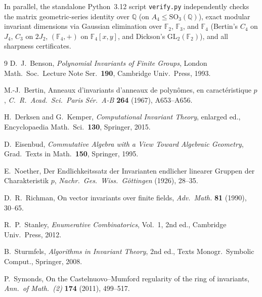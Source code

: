 \documentclass[11pt]{article}
\theoremstyle{definition}
\theoremstyle{remark}
\begin{document}
In parallel, the standalone Python~3.12 script \texttt{verify.py} independently checks the matrix geometric-series identity over $\mathbb{Q}$ (on $A_4 \le \mathrm{SO}_3(\mathbb{Q})$), exact modular invariant dimensions via Gaussian elimination over $\mathbb{F}_2$, $\mathbb{F}_3$, and $\mathbb{F}_4$ (Bertin's $C_4$ on $J_4$, $C_3$ on $2J_2$, $(\mathbb{F}_4,+)$ on $\mathbb{F}_4[x,y]$, and Dickson's $\mathrm{GL}_2(\mathbb{F}_2)$), and all sharpness certificates.

\begin{thebibliography}{9}
D.~J.~Benson, \emph{Polynomial Invariants of Finite Groups}, London Math.\ Soc.\ Lecture Note Ser.\ \textbf{190}, Cambridge Univ.\ Press, 1993.

M.-J.~Bertin, Anneaux d'invariants d'anneaux de polyn\^omes, en caract\'eristique $p$, \emph{C.\ R.\ Acad.\ Sci.\ Paris S\'er.\ A-B} \textbf{264} (1967), A653--A656.

H.~Derksen and G.~Kemper, \emph{Computational Invariant Theory}, enlarged ed., Encyclopaedia Math.\ Sci.\ \textbf{130}, Springer, 2015.

D.~Eisenbud, \emph{Commutative Algebra with a View Toward Algebraic Geometry}, Grad.\ Texts in Math.\ \textbf{150}, Springer, 1995.

E.~Noether, Der Endlichkeitssatz der Invarianten endlicher linearer Gruppen der Charakteristik $p$, \emph{Nachr.\ Ges.\ Wiss.\ G\"ottingen} (1926), 28--35.

D.~R.~Richman, On vector invariants over finite fields, \emph{Adv.\ Math.} \textbf{81} (1990), 30--65.

R.~P.~Stanley, \emph{Enumerative Combinatorics}, Vol.~1, 2nd ed., Cambridge Univ.\ Press, 2012.

B.~Sturmfels, \emph{Algorithms in Invariant Theory}, 2nd ed., Texts Monogr.\ Symbolic Comput., Springer, 2008.

P.~Symonds, On the Castelnuovo--Mumford regularity of the ring of invariants, \emph{Ann.\ of Math.\ (2)} \textbf{174} (2011), 499--517.
\end{thebibliography}
\end{document}
